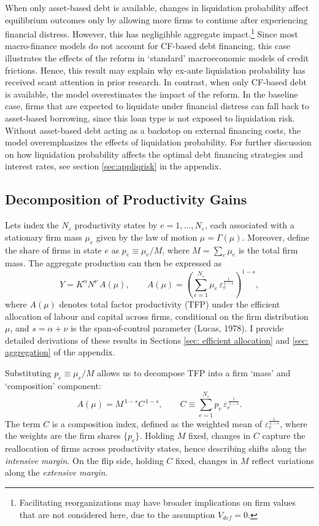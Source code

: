 \documentclass[12pt]{article}
\begin{document}
\noindent When only asset-based debt is available, changes in liquidation probability affect equilibrium outcomes only by allowing more firms to continue after experiencing financial distress. However, this has negligihble aggregate impact.\footnote{Facilitating reorganizations may have broader implications on firm values that are not considered here, due to the assumption $V_{def} = 0$.} Since most macro-finance models do not account for CF-based debt financing, this case illustrates the effects of the reform in `standard' macroeconomic models of credit frictions. Hence, this result may explain why ex-ante liquidation probability has received scant attention in prior research. In contrast, when only CF-based debt is available, the model overestimates the impact of the reform. In the baseline case, firms that are expected to liquidate under financial distress can fall back to asset-based borrowing, since this loan type is not exposed to liquidation risk. Without asset-based debt acting as a backstop on external financing costs, the model overemphasizes the effects of liquidation probability. For further discussion on how liquidation probability affects the optimal debt financing strategies and interest rates, see section \ref{sec:appliqrisk} in the appendix. 

\subsection{Decomposition of Productivity Gains}

Lets index the $N_\varepsilon$ productivity states by $e=1,\dots,N_\varepsilon$, each associated with a stationary firm mass $\mu_e$ given by the law of motion $\mu=\Gamma(\mu)$. Moreover, define the share of firms in state $e$ as $p_e \equiv \mu_e/M$, where $M=\sum_e \mu_e$ is the total firm mass. The aggregate production can then be expressed as
$$ Y = K^{\alpha}N^{\nu}\,A(\mu),  \qquad 
   A(\mu)=\left(\sum_{e=1}^{N_\varepsilon}\mu_e\,\varepsilon_e^{\tfrac{1}{1-s}}\right)^{1-s}, $$
where $A(\mu)$ denotes total factor productivity (TFP) under the efficient allocation of labour and capital across firms, conditional on the firm distribution $\mu$, and $s=\alpha+\nu$ is the span-of-control parameter (Lucas, 1978). I provide detailed derivations of these results in Sections \ref{sec: efficient allocation} and \ref{sec: aggregation} of the appendix.

Substituting $p_e \equiv \mu_e/M$ allows us to decompose TFP into a firm `mass' and `composition' component:
$$ A(\mu)= M^{\,1-s}C^{\,1-s},\qquad 
   C \equiv \sum_{e=1}^{N_\varepsilon} p_e\,\varepsilon_e^{\,\frac{1}{1-s}}. $$
The term $C$ is a composition index, defined as the weighted mean of $\varepsilon_e^{\tfrac{1}{1-s}}$, where the weights are the firm shares $\{p_e\}$. Holding $M$ fixed, changes in $C$ capture the reallocation of firms across productivity states, hence describing shifts along the \textit{intensive margin}. On the flip side, holding $C$ fixed, changes in $M$ reflect variations along the \textit{extensive margin}.
\end{document}
